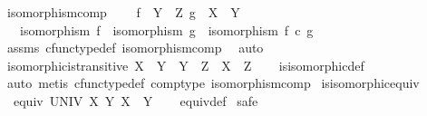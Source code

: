 \begin{isabellebody}
\isanewline
{}\isamarkupfalse%
\ isomorphism{\isacharunderscore}{\kern0pt}comp{\isacharprime}{\kern0pt}{\isacharcolon}{\kern0pt}\ \isanewline
\ \ \ {\isachardoublequoteopen}f\ {\isacharcolon}{\kern0pt}\ Y\ {\isasymrightarrow}\ Z{\isachardoublequoteclose}\ {\isachardoublequoteopen}g\ {\isacharcolon}{\kern0pt}\ X\ {\isasymrightarrow}\ Y{\isachardoublequoteclose}\isanewline
\ \ \ {\isachardoublequoteopen}isomorphism\ f\ {\isasymLongrightarrow}\ isomorphism\ g\ {\isasymLongrightarrow}\ isomorphism\ {\isacharparenleft}{\kern0pt}f\ {\isasymcirc}\isactrlsub c\ g{\isacharparenright}{\kern0pt}{\isachardoublequoteclose}\isanewline
%
\isadelimproof
\ \ %
\endisadelimproof
%
\isatagproof
{}\isamarkupfalse%
\ assms\ cfunc{\isacharunderscore}{\kern0pt}type{\isacharunderscore}{\kern0pt}def\ isomorphism{\isacharunderscore}{\kern0pt}comp\ \isamarkupfalse%
\ auto%
\endisatagproof
{\isafoldproof}%
%
\isadelimproof
\isanewline
%
\endisadelimproof
\isanewline
{}\isamarkupfalse%
\ isomorphic{\isacharunderscore}{\kern0pt}is{\isacharunderscore}{\kern0pt}transitive{\isacharcolon}{\kern0pt}\ {\isachardoublequoteopen}{\isacharparenleft}{\kern0pt}X\ {\isasymcong}\ Y\ {\isasymand}\ Y\ {\isasymcong}\ Z{\isacharparenright}{\kern0pt}\ {\isasymlongrightarrow}\ X\ {\isasymcong}\ Z{\isachardoublequoteclose}\isanewline
%
\isadelimproof
\ \ %
\endisadelimproof
%
\isatagproof
{}\isamarkupfalse%
\ is{\isacharunderscore}{\kern0pt}isomorphic{\isacharunderscore}{\kern0pt}def\ \isamarkupfalse%
\ {\isacharparenleft}{\kern0pt}auto{\isacharcomma}{\kern0pt}\ metis\ cfunc{\isacharunderscore}{\kern0pt}type{\isacharunderscore}{\kern0pt}def\ comp{\isacharunderscore}{\kern0pt}type\ isomorphism{\isacharunderscore}{\kern0pt}comp{\isacharparenright}{\kern0pt}%
\endisatagproof
{\isafoldproof}%
%
\isadelimproof
\isanewline
%
\endisadelimproof
\isanewline
{}\isamarkupfalse%
\ is{\isacharunderscore}{\kern0pt}isomorphic{\isacharunderscore}{\kern0pt}equiv{\isacharcolon}{\kern0pt}\isanewline
\ \ {\isachardoublequoteopen}equiv\ UNIV\ {\isacharbraceleft}{\kern0pt}{\isacharparenleft}{\kern0pt}X{\isacharcomma}{\kern0pt}\ Y{\isacharparenright}{\kern0pt}{\isachardot}{\kern0pt}\ X\ {\isasymcong}\ Y{\isacharbraceright}{\kern0pt}{\isachardoublequoteclose}\isanewline
%
\isadelimproof
\ \ %
\endisadelimproof
%
\isatagproof
{}\isamarkupfalse%
\ equiv{\isacharunderscore}{\kern0pt}def\isanewline
{}\isamarkupfalse%
\ safe\isanewline
\ \ \isamarkupfalse%

\end{isabellebody}

